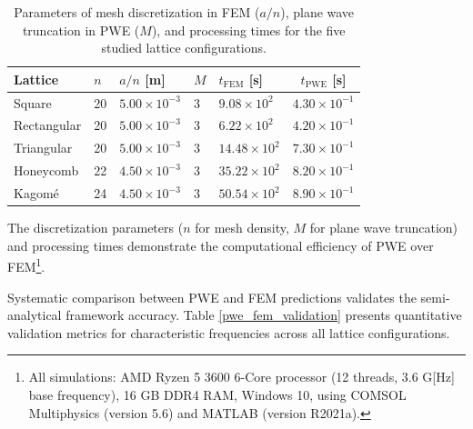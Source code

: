 \documentclass[review,numbers,sort&compress]{elsarticle}
\begin{document}
\begin{table}[htb]
\small
\centering
\caption{Parameters of mesh discretization in FEM (\(a/n\)), plane wave truncation in PWE (\(M\)), and processing times for the five studied lattice configurations.}
\label{time_process_simu_methods}
\begin{tabular}{l l l l l c}
\hline
Lattice & \(n\) & \(a/n\) [m] & \(M\) & \(t_\text{FEM}\) [s] & \(t_\text{PWE}\) [s] \\
\hline
Square & 20 & \(5.00 \times 10^{-3}\) & 3 & \(9.08 \times 10^2\) & \(4.30 \times 10^{-1}\) \\
Rectangular & 20 & \(5.00 \times 10^{-3}\) & 3 & \(6.22 \times 10^2\) & \(4.20 \times 10^{-1}\) \\
Triangular & 20 & \(5.00 \times 10^{-3}\) & 3 & \(14.48 \times 10^2\) & \(7.30 \times 10^{-1}\) \\
Honeycomb & 22 & \(4.50 \times 10^{-3}\) & 3 & \(35.22 \times 10^2\) & \(8.20 \times 10^{-1}\) \\
Kagomé & 24 & \(4.50 \times 10^{-3}\) & 3 & \(50.54 \times 10^2\) & \(8.90 \times 10^{-1}\) \\
\hline
\end{tabular}
\end{table}

The discretization parameters ($n$ for mesh density, $M$ for plane wave truncation) and processing times demonstrate the computational efficiency of PWE over FEM\footnote{All simulations: AMD Ryzen 5 3600 6-Core processor (12 threads, 3.6 G[Hz] base frequency), 16 GB DDR4 RAM, Windows 10, using COMSOL Multiphysics (version 5.6) and MATLAB (version R2021a).}.

Systematic comparison between PWE and FEM predictions validates the semi-analytical framework accuracy. Table \ref{pwe_fem_validation} presents quantitative validation metrics for characteristic frequencies across all lattice configurations.
\end{document}
